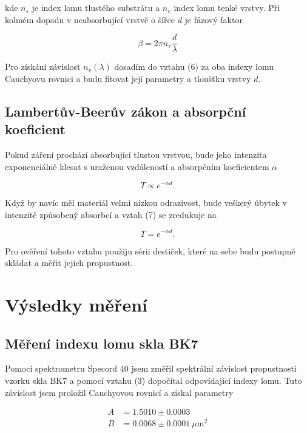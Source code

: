 \documentclass[a4paper,11pt]{article}
\begin{document}
\noindent
kde $ n_s $ je index lomu tlustého substrátu a $ n_v $ index lomu tenké vrstvy. Při kolmém dopadu v neabsorbující vrstvě o šířce $ d $ je fázový faktor

\begin{equation}
\beta = 2 \pi n_v \frac{d}{\lambda}
\end{equation}

Pro získání závislost $ n_v(\lambda) $ dosadím do vztahu (6) za oba indexy lomu Cauchyovu rovnici a budu fitovat její parametry a tloušťku vrstvy $ d $.

\subsection{Lambertův-Beerův zákon a absorpční koeficient}

Pokud záření prochází absorbující tlustou vrstvou, bude jeho intenzita exponenciálně klesat s uraženou vzdáleností a absorpčním koeficientem $ \alpha $

\begin{equation}
T \propto e^{-\alpha d}.
\end{equation}

Když by navíc měl materiál velmi nízkou odrazivost, bude veškerý úbytek v intenzitě způsobený absorbcí a vztah (7) se zredukuje na

\begin{equation}
T = e^{-\alpha d}.
\end{equation}

Pro ověření tohoto vztahu použiju sérii destiček, které na sebe budu postupně skládat a měřit jejich propustnost.

\newpage

\section{Výsledky měření}

\subsection{Měření indexu lomu skla BK7}

Pomocí spektrometru Specord 40 jsem změřil spektrální závislost propustnosti vzorku skla BK7 a pomocí vztahu (3) dopočítal odpovídající indexy lomu. Tuto závislost jsem proložil Cauchyovou rovnicí a získal parametry

\vspace{-5pt}

\begin{align*}
    A &= 1.5010 \pm 0.0003 \\
    B &= 0.0068 \pm 0.0001 \ \mu \text{m} ^2
\end{align*}
\end{document}
